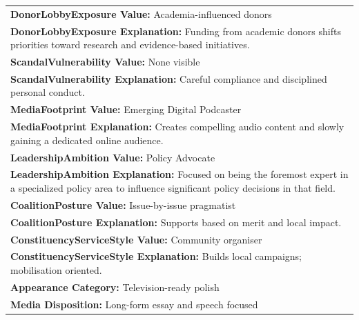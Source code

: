 \documentclass[11pt]{article}
\begin{document}
\begin{table}[ht]
\begin{tabularx}{\textwidth}{X}
\textbf{DonorLobbyExposure Value:} Academia-influenced donors \\
\textbf{DonorLobbyExposure Explanation:} Funding from academic donors shifts priorities toward research and evidence-based initiatives. \\[4pt]

\textbf{ScandalVulnerability Value:} None visible \\
\textbf{ScandalVulnerability Explanation:} Careful compliance and disciplined personal conduct. \\[4pt]

\textbf{MediaFootprint Value:} Emerging Digital Podcaster \\
\textbf{MediaFootprint Explanation:} Creates compelling audio content and slowly gaining a dedicated online audience. \\[4pt]

\textbf{LeadershipAmbition Value:} Policy Advocate \\
\textbf{LeadershipAmbition Explanation:} Focused on being the foremost expert in a specialized policy area to influence significant policy decisions in that field. \\[4pt]

\textbf{CoalitionPosture Value:} Issue-by-issue pragmatist \\
\textbf{CoalitionPosture Explanation:} Supports based on merit and local impact. \\[4pt]

\textbf{ConstituencyServiceStyle Value:} Community organiser \\
\textbf{ConstituencyServiceStyle Explanation:} Builds local campaigns; mobilisation oriented. \\[4pt]

\textbf{Appearance Category:} Television-ready polish \\
\textbf{Media Disposition:} Long-form essay and speech focused \\[4pt]


\end{tabularx}
\end{table}
\end{document}
